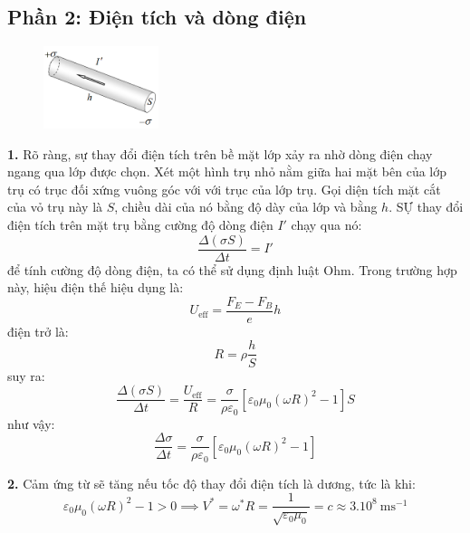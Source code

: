 \subsection*{Phần 2: Điện tích và dòng điện}
\begin{figure}
  \centering
  \vspace{-4mm}
  \includegraphics[width=0.3\textwidth]{Figures/P2/Fig 2.3S.png}
\end{figure}


\noindent\textbf{1.} Rõ ràng, sự thay đổi điện tích trên bề mặt lớp xảy ra nhờ dòng điện chạy ngang qua lớp được chọn. Xét một hình trụ nhỏ nằm giữa hai mặt bên của lớp trụ có trục đối xứng vuông góc với với trục của lớp trụ. Gọi diện tích mặt cắt của vỏ trụ này là $S$, chiều dài của nó bằng độ dày của lớp và bằng $h$. SỰ thay đổi điện tích trên mặt trụ bằng cường độ dòng điện $I'$ chạy qua nó:
\begin{equation*}
  \frac{\Delta(\sigma S)}{\Delta t}=I'
\end{equation*}
để tính cường độ dòng điện, ta có thể sử dụng định luật Ohm. Trong trường hợp này, hiệu điện thế hiệu dụng là:
\begin{equation*}
  U_{\text{eff}}=\frac{F_{E}-F_{B}}{e}h
\end{equation*}
điện trở là:
\begin{equation*}
  R=\rho\frac{h}{S}
\end{equation*}
suy ra:
\begin{equation*}
  \frac{\Delta(\sigma S)}{\Delta t}=\frac{U_{\text{eff}}}{R}=\frac{\sigma}{\rho \varepsilon_{0}}\left[\varepsilon_{0}\mu_{0}(\omega R)^{2}-1\right]S
\end{equation*}
như vậy:
\begin{equation*}
  \frac{\Delta\sigma}{\Delta t}=\frac{\sigma}{\rho \varepsilon_{0}}\left[\varepsilon_{0}\mu_{0}(\omega R)^{2}-1\right]
\end{equation*}

\noindent\textbf{2.} Cảm ứng từ sẽ tăng nếu tốc độ thay đổi điện tích là dương, tức là khi:
\begin{equation*}
  \varepsilon_{0}\mu_{0}(\omega R)^{2}-1>0\implies V^{*}=\omega^{*}R=\frac{1}{\sqrt{\varepsilon_{0}\mu_{0}}}=c\approx 3.10^{8}\SI{}{\metre\second^{-1}}
\end{equation*}

